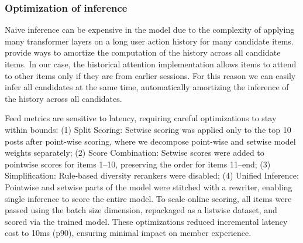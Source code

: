 \subsubsection{Optimization of inference}\label{optimization_inference}
Naive inference can be expensive in the {\systemname} model due to the complexity of applying many transformer layers on a long user action history for many candidate items. \cite{HSTU_paper_zhai24a, efficient_transact_paper} provide ways to amortize the computation of the history across all candidate items. In our case, the historical attention implementation allows items to attend to other items only if they are from earlier sessions. For this reason we can easily infer all candidates at the same time, automatically amortizing the inference of the history across all candidates. 


Feed metrics are sensitive to latency, requiring careful optimizations to stay within bounds: (1) Split Scoring: Setwise scoring was applied only to the top 10 posts after point-wise scoring, where we decompose point-wise and setwise model weights separately; (2) Score Combination: Setwise scores were added to pointwise scores for items 1–10, preserving the order for items 11–end; (3) Simplification: Rule-based diversity rerankers were disabled; (4) Unified Inference: Pointwise and setwise parts of the model were stitched with a rewriter, enabling single inference to score the entire model.
To scale online scoring, all items were passed using the batch size dimension, repackaged as a listwise dataset, and scored via the trained model. These optimizations reduced incremental latency cost to 10ms (p90), ensuring minimal impact on member experience.


